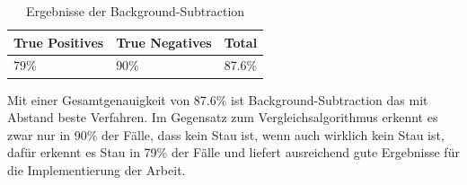 \begin{table}[ht]
  \centering
\scriptsize
    \begin{tabular}{ | l | l | l |}
    \hline
		True Positives & True Negatives & Total \\ \hline
    79\% &
		90\% &
		87.6\% \\
    \hline
    \end{tabular}
  \caption{Ergebnisse der Background-Subtraction}
\end{table}

Mit einer Gesamtgenauigkeit von 87.6\% ist Background-Subtraction das mit Abstand beste Verfahren. Im Gegensatz zum Vergleichsalgorithmus erkennt es zwar nur in 90\% der Fälle, dass kein Stau ist, wenn auch wirklich kein Stau ist, dafür erkennt es Stau in 79\% der Fälle und liefert ausreichend gute Ergebnisse für die Implementierung der Arbeit.
